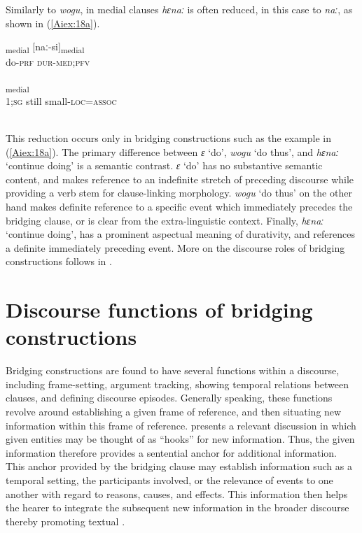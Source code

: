 \documentclass[output=paper]{LSP/langsci}
\begin{document}
Similarly to \textit{wogu}, in medial clauses \textit{hɛnaː} is often reduced, in this case to \textit{naː}, as shown in (\ref{Aiex:18a}).

\begin{exe}
\ex \label{Aiex:18ab}
\begin{xlist}
\ex \label{Aiex:18a}
\gll [ɛ-ɸɛija]\textsubscript{medial}	[naː-si]\textsubscript{medial}\\
do-\textsc{prf}	\textsc{dur-med;pfv}\\
\glt {}\\
\ex \label{Aiex:18b}
\gll [nɛ	ɛna	hodosu-wɛ=mi]\textsubscript{medial}\\
\textsc{1;sg}	still	small\textsc{-loc=assoc}\\
\glt {}\\
\end{xlist}
\end{exe}

This reduction occurs only in bridging constructions such as the example in (\ref{Aiex:18a}). The primary difference between \textit{ɛ} ‘do’, \textit{wogu} ‘do thus’, and \textit{hɛnaː} ‘continue doing’ is a semantic contrast. \textit{ɛ} ‘do’ has no substantive semantic content, and makes reference to an indefinite stretch of preceding discourse while providing a verb stem for clause-linking morphology. \textit{wogu} ‘do thus’ on the other hand makes definite reference to a specific event which immediately precedes the bridging clause, or is clear from the extra-linguistic context. Finally, \textit{hɛnaː} ‘continue doing’, has a prominent aspectual meaning of durativity, and references a definite immediately preceding event. More on the discourse roles of bridging constructions follows in .

\section{Discourse functions of bridging constructions} 
\label{AiDiscourse}
Bridging constructions are found to have several functions within a discourse, including frame-setting, argument tracking, showing temporal relations between clauses, and defining discourse episodes. Generally speaking, these functions revolve around establishing a given frame of reference, and then situating new information within this frame of reference. \citet{prince81} presents a relevant discussion in which given entities may be thought of as ``hooks'' for new information. Thus, the given information therefore provides a sentential anchor for additional information. This anchor provided by the bridging clause may establish information such as a temporal setting, the participants involved, or the relevance of events to one another with regard to reasons, causes, and effects. This information then helps the hearer to integrate the subsequent new information in the broader discourse thereby promoting textual .
\end{document}
